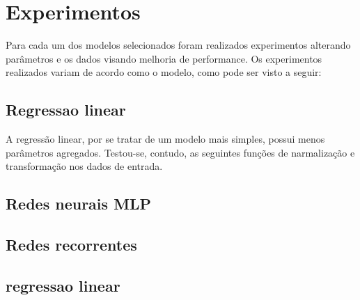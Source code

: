 
\chapter{Experimentos}

Para cada um dos modelos selecionados foram realizados experimentos
alterando parâmetros e os dados visando melhoria de performance. Os experimentos
realizados variam de acordo como o modelo, como pode ser visto a seguir:

\section{Regressao linear}

A regressão linear, por se tratar de um modelo mais simples, 
possui menos parâmetros agregados. Testou-se, contudo, as 
seguintes funções de narmalização e transformação
nos dados de entrada.

\section{Redes neurais MLP}
\section{Redes recorrentes}
\section{regressao linear}
